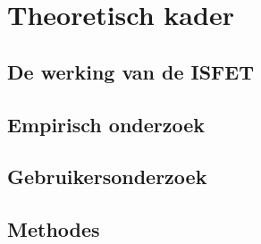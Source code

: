 \section{Theoretisch kader}

\subsection{De werking van de ISFET}


\subsection{Empirisch onderzoek}

\subsection{Gebruikersonderzoek}

\subsection{Methodes}



